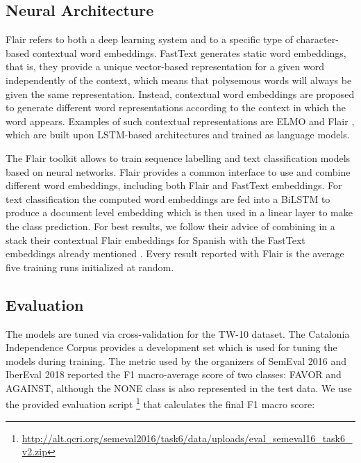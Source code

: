 \documentclass[10pt, a4paper]{article}
\begin{document}
\subsection{Neural Architecture}\label{sec:neural-architecture}

Flair refers to both a deep learning system and to a specific type of character-based contextual word embeddings. FastText generates static word embeddings, that is, they provide a unique vector-based representation for a given word independently of the context, which means that polysemous words will always be given the same representation. Instead, contextual word embeddings are proposed to generate different word representations according to the context in which the word appears. Examples of such contextual representations are ELMO \cite{Peters:2018} and Flair \cite{akbik-etal-2018-contextual}, which are built upon LSTM-based architectures and trained as language models.

The Flair toolkit \cite{akbik-etal-2019-flair} allows to train sequence labelling and text classification models based on neural networks. Flair provides a common interface to use and combine different word embeddings, including both Flair and FastText embeddings. For text classification the computed word embeddings are fed into a BiLSTM to produce a document level embedding which is then used in a linear layer to make the class prediction. For best results, we follow their advice of combining in a stack their contextual Flair embeddings for Spanish with the FastText embeddings already mentioned \cite{akbik-etal-2018-contextual}. Every result reported with Flair is the average five training runs initialized at random.

\subsection{Evaluation}\label{sec:evaluation}

The models are tuned via cross-validation for the TW-10 dataset. The Catalonia Independence Corpus provides a development set which is used for tuning the models during training. The metric used by the organizers of SemEval 2016 \cite{mohammad-etal-2016-semeval} and IberEval 2018 \cite{taule18} reported the F1 macro-average score of two classes: FAVOR and AGAINST, although the NONE class is also represented in the test data. We use the provided evaluation script \footnote{\url{http://alt.qcri.org/semeval2016/task6/data/uploads/eval_semeval16_task6_v2.zip}} that calculates the final F1 macro score:
\end{document}
